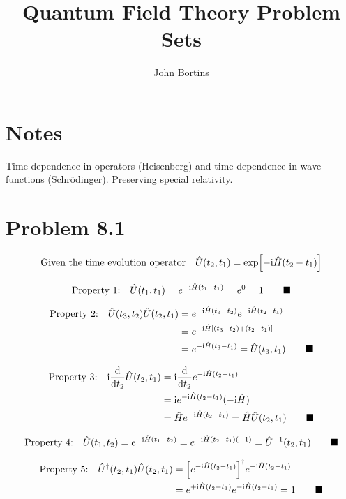 \documentclass{article}
\title{Quantum Field Theory Problem Sets}
\author{John Bortins}
\begin{document}
 
\maketitle{}

\section*{Notes}

Time dependence in operators (Heisenberg) and time dependence in wave functions (Schr\"odinger). Preserving special relativity.
 
\section*{Problem 8.1} 

\[\qq*{Given the time evolution operator} \hat{U}(t_2,t_1)=\exp[-\text{i}\hat{H}(t_2-t_1)] \]
 
\[\qq*{Property 1:} \hat{U}(t_1,t_1)=e^{-\text{i}\hat{H}(t_1-t_1)}=e^{0}=1\qquad\blacksquare \]

\begin{align*}
\qq*{Property 2:} \hat{U}(t_3,t_2)\hat{U}(t_2,t_1)&=e^{-\text{i}\hat{H}(t_3-t_2)}e^{-\text{i}\hat{H}(t_2-t_1)}\\
&=e^{-\text{i}\hat{H}[(t_3-t_2)+(t_2-t_1)]}\\
&=e^{-\text{i}\hat{H}(t_3-t_1)}=\hat{U}(t_3,t_1)\qquad\blacksquare 
\end{align*}

\begin{align*}
\qq*{Property 3:} \text{i}\dv{t_2}\hat{U}(t_2,t_1)&=\text{i}\dv{t_2}e^{-\text{i}\hat{H}(t_2-t_1)}\\
&=\text{i}e^{-\text{i}\hat{H}(t_2-t_1)}(-\text{i}\hat{H}) \\
&=\hat{H}e^{-\text{i}\hat{H}(t_2-t_1)}=\hat{H}\hat{U}(t_2,t_1) \qquad\blacksquare 
\end{align*}
 

\[\qq*{Property 4:} \hat{U}(t_1,t_2)=e^{-\text{i}\hat{H}(t_1-t_2)}=e^{-\text{i}\hat{H}(t_2-t_1)(-1)}=\hat{U}^{-1}(t_2,t_1)\qquad\blacksquare \]

\begin{align*}
\qq*{Property 5:} \hat{U}^{\dagger}(t_2,t_1)\hat{U}(t_2,t_1)&=\qty[e^{-\text{i}\hat{H}(t_2-t_1)}]^{\dagger} e^{-\text{i}\hat{H}(t_2-t_1)}\\
&=e^{+\text{i}\hat{H}(t_2-t_1)}e^{-\text{i}\hat{H}(t_2-t_1)}=1 \qquad\blacksquare 
\end{align*}
 
\end{document}
